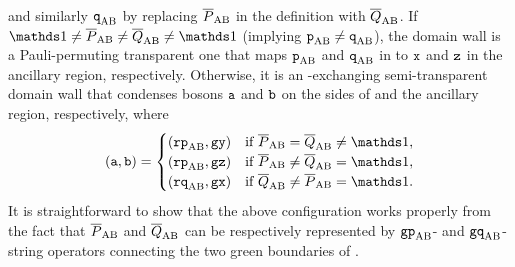 \documentclass[
 prx,
 reprint,
 superscriptaddress,
 longbibliography,
 dvipsnames
]{revtex4-2}
\begin{document}
and similarly $\texttt{q}_{\mathrm{AB}}$ by replacing $\overline{P}_{\mathrm{AB}}$ in the definition with $\overline{Q}_{\mathrm{AB}}$.
If $\identity \neq \lgc{P}_\mr{AB} \neq \lgc{Q}_\mr{AB} \neq \identity$ (implying $\texttt{p}_{\mathrm{AB}} \neq \texttt{q}_{\mathrm{AB}}$), the domain wall is a Pauli-permuting transparent one that maps $\texttt{p}_{\mathrm{AB}}$ and $\texttt{q}_{\mathrm{AB}}$ in \patchab to $\texttt{x}$ and $\texttt{z}$ in the ancillary region, respectively.
Otherwise, it is an -exchanging semi-transparent domain wall that condenses bosons $\texttt{a}$ and $\texttt{b}$ on the sides of \patchab and the ancillary region, respectively, where
\begin{align}
    \qty(\ttt{a}, \ttt{b}) = \begin{cases}
        \qty(\rbs\pbs_\mr{AB}, \gy) & \text{if } \lgc{P}_\mr{AB} = \lgc{Q}_\mr{AB} \neq \identity, \\
        \qty(\rbs\pbs_\mr{AB}, \gz) & \text{if } \lgc{P}_\mr{AB} \neq \lgc{Q}_\mr{AB} = \identity, \\
        \qty(\rbs\qbs_\mr{AB}, \gx) & \text{if } \lgc{Q}_\mr{AB} \neq \lgc{P}_\mr{AB} = \identity. \\
    \end{cases}
    \label{eq:rec_patch_domain_wall_condensed_bosons}
\end{align}
It is straightforward to show that the above configuration works properly from the fact that $\overline{P}_{\mathrm{AB}}$ and $\overline{Q}_{\mathrm{AB}}$ can be respectively represented by $\texttt{g}\texttt{p}_{\mathrm{AB}}$- and $\texttt{g}\texttt{q}_{\mathrm{AB}}$-string operators connecting the two green boundaries of \patchab.
\end{document}
